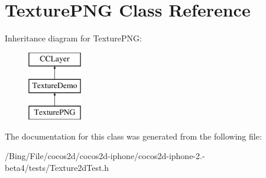 \hypertarget{interface_texture_p_n_g}{\section{Texture\-P\-N\-G Class Reference}
\label{interface_texture_p_n_g}
}
Inheritance diagram for Texture\-P\-N\-G\-:\begin{figure}[H]
\begin{center}
\leavevmode
\includegraphics[height=3.000000cm]{interface_texture_p_n_g}
\end{center}
\end{figure}


The documentation for this class was generated from the following file\-:\begin{DoxyCompactItemize}
\item 
/\-Bing/\-File/cocos2d/cocos2d-\/iphone/cocos2d-\/iphone-\/2.-\/beta4/tests/Texture2d\-Test.\-h\end{DoxyCompactItemize}
